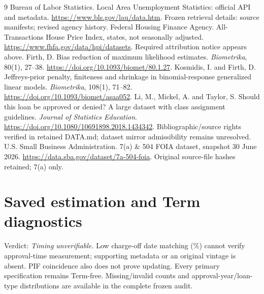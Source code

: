 \begin{thebibliography}{9}
 Bureau of Labor Statistics. Local Area Unemployment Statistics: official API and metadata. \url{https://www.bls.gov/lau/data.htm}. Frozen retrieval details: source manifests; revised agency history.
 Federal Housing Finance Agency. All-Transactions House Price Index, states, not seasonally adjusted. \url{https://www.fhfa.gov/data/hpi/datasets}. Required attribution notice appears above.
 Firth, D. Bias reduction of maximum likelihood estimates. \emph{Biometrika}, 80(1), 27--38. \url{https://doi.org/10.1093/biomet/80.1.27}.
 Kosmidis, I. and Firth, D. Jeffreys-prior penalty, finiteness and shrinkage in binomial-response generalized linear models. \emph{Biometrika}, 108(1), 71--82. \url{https://doi.org/10.1093/biomet/asaa052}.
 Li, M., Mickel, A. and Taylor, S. Should this loan be approved or denied? A large dataset with class assignment guidelines. \emph{Journal of Statistics Education}. \url{https://doi.org/10.1080/10691898.2018.1434342}. Bibliographic/source rights verified in retained DATA.md; dataset mirror admissibility remains unresolved.
 U.S. Small Business Administration. 7(a) \& 504 FOIA dataset, snapshot 30 June 2026. \url{https://data.sba.gov/dataset/7a-504-foia}. Original source-file hashes retained; 7(a) only.
\end{thebibliography}

\appendix
\section{Saved estimation and Term diagnostics}
Verdict: \emph{Timing unverifiable.} Low charge-off date matching (\TermMatch\%) cannot verify approval-time measurement; supporting metadata or an original vintage is absent. PIF coincidence also does not prove updating. Every primary specification remains Term-free. Missing/invalid counts and approval-year/loan-type distributions are available in the complete frozen audit.

